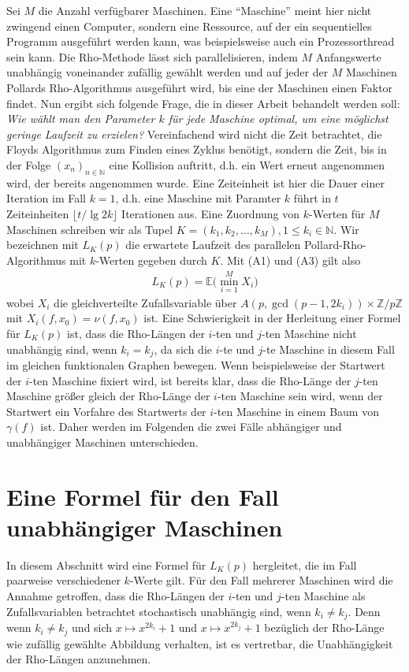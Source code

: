 \documentclass[a4paper, 10pt, ngerman]{article}
\newcommand{\N}{\mathbb{N}}
\newcommand{\Z}{\mathbb{Z}}
\newcommand{\E}{\mathbb{E}}
\begin{document}
Sei $M$ die Anzahl verfügbarer Maschinen. Eine "`Maschine"'  meint hier nicht zwingend einen Computer, sondern eine Ressource, auf der ein sequentielles Programm ausgeführt werden kann, was beispielsweise auch ein Prozessorthread sein kann. Die Rho-Methode lässt sich parallelisieren, indem $M$ Anfangswerte unabhängig voneinander zufällig gewählt werden und auf jeder der $M$ Maschinen Pollards Rho-Algorithmus ausgeführt wird, bis eine der Maschinen einen Faktor findet. Nun ergibt sich folgende Frage, die in dieser Arbeit behandelt werden soll: \emph{Wie wählt man den Parameter $k$ für jede Maschine optimal, um eine möglichst geringe Laufzeit zu erzielen?} Vereinfachend wird nicht die Zeit betrachtet, die Floyds Algorithmus zum Finden eines Zyklus benötigt, sondern die Zeit, bis in der Folge $(x_n)_{n \in \N}$ eine Kollision auftritt, d.h. ein Wert erneut angenommen wird, der bereits angenommen wurde. Eine Zeiteinheit ist hier die Dauer einer Iteration im Fall $k = 1$, d.h. eine Maschine mit Paramter $k$ führt in $t$ Zeiteinheiten $\lfloor t / \lg 2k \rfloor$ Iterationen aus. Eine Zuordnung von $k$-Werten für $M$ Maschinen schreiben wir als Tupel $K = (k_1, k_2, \dots, k_M), 1 \le k_i \in \N$.  Wir bezeichnen mit $L_K(p)$ die erwartete Laufzeit des parallelen Pollard-Rho-Algorithmus mit $k$-Werten gegeben durch $K$. Mit (A1) und (A3) gilt also
\begin{align*}
    L_K(p) = \E \bigg ( \min_{i = 1}^M X_i \bigg )
\end{align*}
wobei $X_i$ die gleichverteilte Zufallsvariable über $A(p, \gcd(p - 1, 2k_i)) \times \Z/p\Z$ mit $X_i(f, x_0) = \nu(f, x_0)$ ist. Eine Schwierigkeit in der Herleitung einer Formel für $L_K(p)$ ist, dass die Rho-Längen der $i$-ten und $j$-ten Maschine nicht unabhängig sind, wenn $k_i = k_j$, da sich die $i$-te und $j$-te Maschine in diesem Fall im gleichen funktionalen Graphen bewegen. Wenn beispielsweise der Startwert der $i$-ten Maschine fixiert wird, ist bereits klar, dass die Rho-Länge der $j$-ten Maschine größer gleich der Rho-Länge der $i$-ten Maschine sein wird, wenn der Startwert ein Vorfahre des Startwerts der $i$-ten Maschine in einem Baum von $\gamma(f)$ ist. Daher werden im Folgenden die zwei Fälle abhängiger und unabhängiger Maschinen unterschieden.

\section{Eine Formel für den Fall unabhängiger Maschinen}

In diesem Abschnitt wird eine Formel für $L_K(p)$ hergleitet, die im Fall paarweise verschiedener $k$-Werte gilt. Für den Fall mehrerer Maschinen wird die Annahme getroffen, dass die Rho-Längen der $i$-ten und $j$-ten Maschine als Zufallsvariablen betrachtet stochastisch unabhängig sind, wenn $k_i \ne k_j$. Denn wenn $k_i \ne k_j$ und sich $x \mapsto x^{2k_i} + 1$ und $x \mapsto x^{2k_j} + 1$ bezüglich der Rho-Länge wie zufällig gewählte Abbildung verhalten, ist es vertretbar, die Unabhängigkeit der Rho-Längen anzunehmen.
\end{document}
